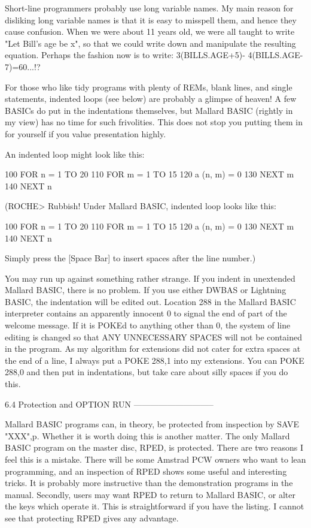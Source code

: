 Short-line  programmers probably use long variable names. My main  reason  for 
disliking  long variable names is that it is easy to misspell them, and  hence 
they  cause confusion. When we were about 11 years old, we were all taught  to 
write  "Let Bill's age be x", so that we could write down and  manipulate  the 
resulting  equation.  Perhaps  the fashion now is  to  write:  3(BILLS.AGE+5)-
4(BILLS.AGE-7)=60...!?

For those who like tidy programs with plenty of REMs, blank lines, and  single 
statements, indented loops (see below) are probably a glimpse of heaven! A few 
BASICs do put in the indentations themselves, but Mallard BASIC (rightly in my 
view) has no time for such frivolities. This does not stop you putting them in 
for yourself if you value presentation highly.

An indented loop might look like this:

        100 FOR n = 1 TO 20
               110 FOR m = 1 TO 15
                    120 a (n, m) = 0
                130 NEXT m
        140 NEXT n

(ROCHE> Rubbish! Under Mallard BASIC, indented loop looks like this:

        100 FOR n = 1 TO 20
        110     FOR m = 1 TO 15
        120         a (n, m) = 0
        130     NEXT m
        140 NEXT n

Simply press the [Space Bar] to insert spaces after the line number.)

You  may run up against something rather strange. If you indent in  unextended 
Mallard  BASIC,  there  is no problem. If you use either  DWBAS  or  Lightning 
BASIC,  the indentation will be edited out. Location 288 in the Mallard  BASIC 
interpreter contains an apparently innocent 0 to signal the end of part of the 
welcome  message. If it is POKEd to anything other than 0, the system of  line 
editing is changed so that ANY UNNECESSARY SPACES will not be contained in the 
program. As my algorithm for extensions did not cater for extra spaces at  the 
end  of  a line, I always put a POKE 288,1 into my extensions.  You  can  POKE 
288,0 and then put in indentations, but take care about silly spaces if you do 
this.


6.4 Protection and OPTION RUN
-----------------------------

Mallard  BASIC programs can, in theory, be protected from inspection  by  SAVE 
"XXX",p.  Whether it is worth doing this is another matter. The  only  Mallard 
BASIC program on the master disc, RPED, is protected. There are two reasons  I 
feel this is a mistake. There will be some Amstrad PCW owners who want to lean 
programming,  and  an  inspection of RPED shows some  useful  and  interesting 
tricks. It is probably more instructive than the demonstration programs in the 
manual. Secondly, users may want RPED to return to Mallard BASIC, or alter the 
keys  which  operate it. This is straightforward if you have  the  listing.  I 
cannot see that protecting RPED gives any advantage.

